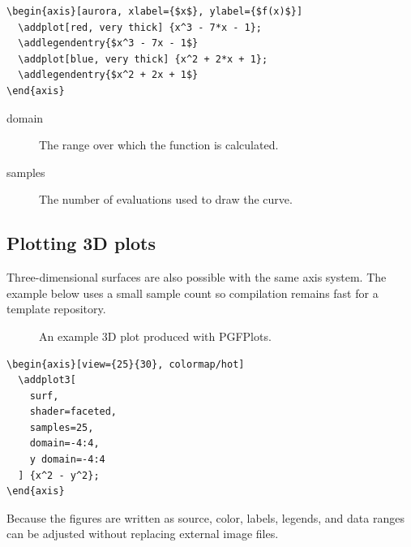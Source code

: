 \begin{lstlisting}[language={[LaTeX]TeX},style=AuroraListing]
\begin{axis}[aurora, xlabel={$x$}, ylabel={$f(x)$}]
  \addplot[red, very thick] {x^3 - 7*x - 1};
  \addlegendentry{$x^3 - 7x - 1$}
  \addplot[blue, very thick] {x^2 + 2*x + 1};
  \addlegendentry{$x^2 + 2x + 1$}
\end{axis}
\end{lstlisting}

\begin{description}
  \item[domain] The range over which the function is calculated.
  \item[samples] The number of evaluations used to draw the curve.
\end{description}

\subsection{Plotting 3D plots}

Three-dimensional surfaces are also possible with the same axis system. The
example below uses a small sample count so compilation remains fast for a
template repository.

\begin{figure}[H]
  \centering
  \caption{An example 3D plot produced with PGFPlots.}
  \label{fig:three-dimensional-plot}
\end{figure}

\begin{lstlisting}[language={[LaTeX]TeX},style=AuroraListing]
\begin{axis}[view={25}{30}, colormap/hot]
  \addplot3[
    surf,
    shader=faceted,
    samples=25,
    domain=-4:4,
    y domain=-4:4
  ] {x^2 - y^2};
\end{axis}
\end{lstlisting}

Because the figures are written as source, color, labels, legends, and data
ranges can be adjusted without replacing external image files.
